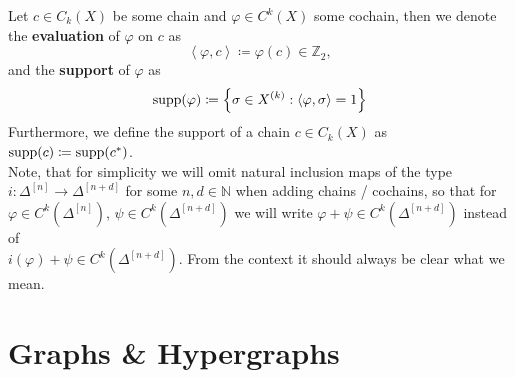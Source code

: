Let \(c\in C_k(X)\) be some chain and \(\varphi\in C^k(X)\) some cochain, then we denote the \textbf{evaluation} of \(\varphi\) on \(c\) as
\[
\left\langle\varphi,c\right\rangle\coloneqq \varphi(c)\in\mathbb{Z}_2,
\]
and the \textbf{support} of \(\varphi\) as
\[
\mathrm{supp}(\varphi)\coloneqq \left\{\sigma\in X^{(k)}:\left\langle\varphi,\sigma\right\rangle=1\right\}
\]
Furthermore, we define the support of a chain \(c\in C_k(X)\) as \(\mathrm{supp}(c)\coloneqq \mathrm{supp}(c^*)\).\\
Note, that for simplicity we will omit natural inclusion maps of the type\\
\(i:\Delta^{[n]}\longrightarrow\Delta^{[n+d]}\) for some \(n,d\in\mathbb{N}\) when adding chains / cochains, so that for \(\varphi\in C^k(\Delta^{[n]})\text{, }\psi\in C^k(\Delta^{[n+d]})\) we will write \(\varphi+\psi\in C^k(\Delta^{[n+d]})\) instead of\\
\(i(\varphi)+\psi\in C^k(\Delta^{[n+d]})\). From the context it should always be clear what we mean.


\section*{Graphs \& Hypergraphs}

